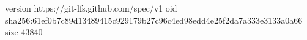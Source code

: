 version https://git-lfs.github.com/spec/v1
oid sha256:61ef0b7c89d13489415c929179b27c96c4ed98edd4e25f2da7a333e3133a0a66
size 43840

